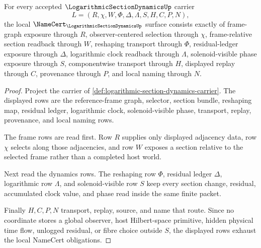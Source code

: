 \begin{theorem}
\label{thm:logarithmic-section-dynamics-namecert-obligations}
For every accepted $\LogarithmicSectionDynamicsUp$ carrier
$$
L=(R,\chi,W,\Phi,\Delta,\Lambda,S,H,C,P,N),
$$
the local $\NameCert_{\LogarithmicSectionDynamicsUp}$ surface consists exactly of frame-graph exposure through $R$, observer-centered selection through $\chi$, frame-relative section readback through $W$, reshaping transport through $\Phi$, residual-ledger exposure through $\Delta$, logarithmic clock readback through $\Lambda$, solenoid-visible phase exposure through $S$, componentwise transport through $H$, displayed replay through $C$, provenance through $P$, and local naming through $N$.
\end{theorem}
\begin{proof}
Project the carrier of \autoref{def:logarithmic-section-dynamics-carrier}. The displayed rows are the reference-frame graph, selector, section bundle, reshaping map, residual ledger, logarithmic clock, solenoid-visible phase, transport, replay, provenance, and local naming rows.

The frame rows are read first. Row $R$ supplies only displayed adjacency data, row $\chi$ selects along those adjacencies, and row $W$ exposes a section relative to the selected frame rather than a completed host world.

Next read the dynamics rows. The reshaping row $\Phi$, residual ledger $\Delta$, logarithmic row $\Lambda$, and solenoid-visible row $S$ keep every section change, residual, accumulated clock value, and phase read inside the same finite packet.

Finally $H,C,P,N$ transport, replay, source, and name that route. Since no coordinate stores a global observer, host Hilbert-space primitive, hidden physical time flow, unlogged residual, or fibre choice outside $S$, the displayed rows exhaust the local NameCert obligations.
\end{proof}

